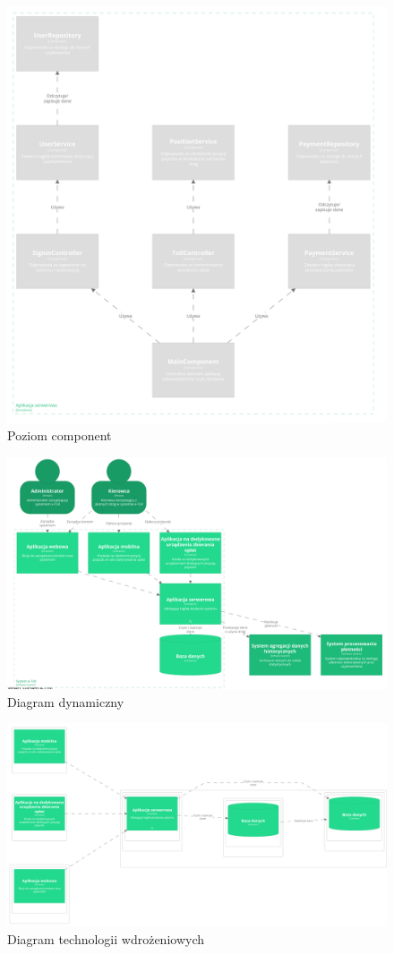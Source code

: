 \documentclass[12pt]{article}
\begin{document}
    \begin{figure}[H]
    \centering
    \includegraphics[width=1\textwidth]{c4/component_server_app.png}
    \caption{Poziom component}
    \label{fig:deployment-tech}
    \end{figure}
    \begin{figure}[H]
    \centering
    \includegraphics[width=1\textwidth]{c4/etool_glebiej.png}
    \caption{Diagram dynamiczny}
    \label{fig:deployment-tech}
    \end{figure}
    \begin{figure}[H]
    \centering
    \includegraphics[width=1\textwidth]{c4/deployment.png}
    \caption{Diagram technologii wdrożeniowych}
    \label{fig:deployment-tech}
    \end{figure}
\end{document}
